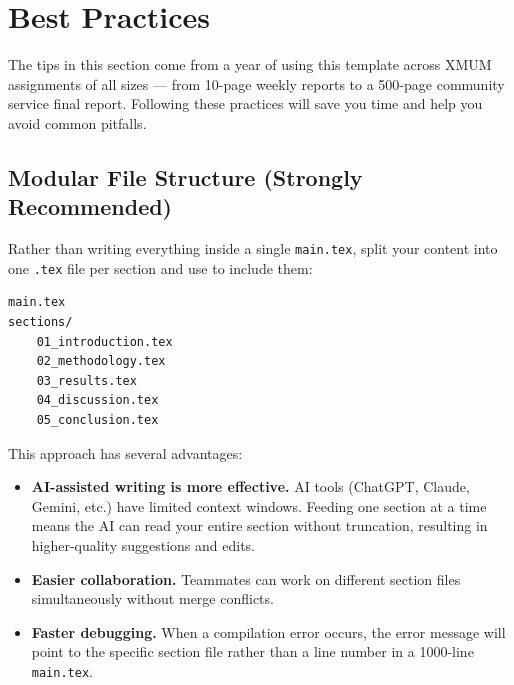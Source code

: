 %

\section{Best Practices}

The tips in this section come from a year of using this template across
XMUM assignments of all sizes — from 10-page weekly reports to a 500-page
community service final report.
Following these practices will save you time and help you avoid common pitfalls.

\subsection{Modular File Structure (Strongly Recommended)}

Rather than writing everything inside a single \texttt{main.tex}, split your
content into one \texttt{.tex} file per section and use \verb|| to
include them:

\begin{verbatim}
main.tex
sections/
    01_introduction.tex
    02_methodology.tex
    03_results.tex
    04_discussion.tex
    05_conclusion.tex
\end{verbatim}

This approach has several advantages:

\begin{itemize}
    \item \textbf{AI-assisted writing is more effective.}
          AI tools (ChatGPT, Claude, Gemini, etc.) have limited context
          windows. Feeding one section at a time means the AI can read your
          entire section without truncation, resulting in higher-quality
          suggestions and edits.
    \item \textbf{Easier collaboration.} Teammates can work on different
          section files simultaneously without merge conflicts.
    \item \textbf{Faster debugging.} When a compilation error occurs, the
          error message will point to the specific section file rather than
          a line number in a 1000-line \texttt{main.tex}.
\end{itemize}


